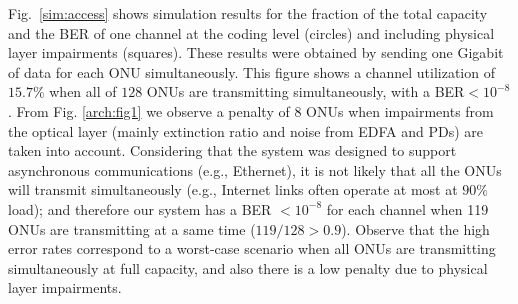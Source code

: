 \documentclass[12pt,twoside,openright]{moddalthesis}
\begin{document}
Fig.~\ref{sim:access} shows simulation results for the fraction of the total
capacity and the BER of one channel at the coding level (circles) and 
including physical layer impairments (squares). These results were obtained by
sending one Gigabit of data for each ONU simultaneously.
This figure shows a channel utilization of $15.7\%$ when all of $128$ ONUs
are transmitting simultaneously, with a BER$<10^{-8}$. 
From Fig. \ref{arch:fig1} we observe a penalty of $8$ ONUs when
impairments from the optical layer (mainly extinction ratio and noise from EDFA and PDs) are taken into account.
Considering that the system was designed to support asynchronous communications (e.g., Ethernet), it is not likely that all the ONUs will transmit simultaneously (e.g., Internet links often operate at most at $90\%$ load); and therefore our system has a BER $<10^{-8}$ for each channel when 119 ONUs are transmitting at a same time ($119/128>0.9$).
%
Observe that the high error rates correspond to a
worst-case scenario when all ONUs are transmitting simultaneously at
full capacity, and also 
there is a low penalty due to physical layer impairments.
\end{document}
